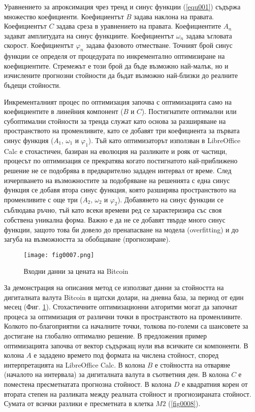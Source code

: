 Уравнението за апроксимация чрез тренд и синус функции (\ref{equ001}) съдържа множество коефициенти. Коефициентът $B$ задава наклона на правата. Коефициентът $C$ задава среза в уравнението на правата. Коефициентите $A_n$ задават амплитудата на синус функциите. Коефициентът $\omega_n$ задава ъгловата скорост. Коефициентът $\varphi_n$ задава фазовото отместване. Точният брой синус функции се определя от процедурата по инкрементално оптимизиране на коефициентите. Стремежът е този брой да бъде възможно най-малък, но и изчислените прогнозни стойности да бъдат възможно най-близки до реалните бъдещи стойности. 

Инкременталният процес по оптимизация започва с оптимизацията само на коефициентите в линейния компонент ($B$ и $C$). Постигнатите оптимални или субоптимални стойности за тренда служат като основа за разширяване на пространството на променливите, като се добавят три коефициента за първата синус функция ($A_1$, $\omega_1$ и $\varphi_1$). Тъй като оптимизаторът използван в LibreOffice Calc е стохастичен, базиран на еволюция на разликите и рояк от частици, процесът по оптимизация се прекратява когато постигнатото най-приближено решение не се подобрява в предварително зададен интервал от време. След изчерпването на възможностите за подобряване на решенията с една синус функция се добавя втора синус функция, която разширява пространството на променливите с още три ($A_2$, $\omega_2$ и $\varphi_2$). Добавянето на синус функции се съблюдава ръчно, тъй като всеки времеви ред се характеризира със своя собствена уникална форма. Важно е да не се добавят твърде много синус функции, защото това би довело до пренапасване на модела (overfitting) и до загуба на възможността за обобщаване (прогнозиране).

\begin{figure}[h]
  \centering
  \texttt{[image: fig0007.png]}
  \caption{Входни данни за цената на Bitcoin}
\label{fig0007}
\end{figure}

За демонстрация на описания метод се използват данни за стойността на дигиталната валута Bitcoin в щатски долари, на дневна база, за период от един месец (Фиг. \ref{fig0007}). Стохастичните оптимизационни алгоритми могат да започнат процеса за оптимизация от различни точки в пространството на променливите. Колкото по-благоприятни са началните точки, толкова по-големи са шансовете за достигане на глобално оптимално решение. В предложения пример оптимизацията започва от вектор съдържащ нули във всичките си компоненти. В колона $A$ е зададено времето под формата на числена стойност, според интерпретацията на LibreOffice Calc. В колона $B$ е стойността на отваряне (началото на интервала) за дигиталната валута в съответния ден. В колона $C$ е поместена пресметнатата прогнозна стойност. В колона $D$ е квадратния корен от втората степен на разликата между реалната стойност и прогнозираната стойност. Сумата от всички разлики е пресметната в клетка $M2$ (\ref{fig0008}).

